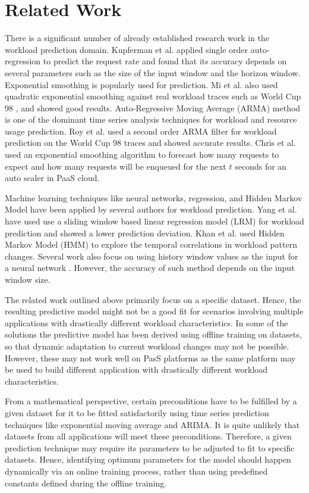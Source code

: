 \section{Related Work}

There is a significant number of already established research work in the workload prediction domain. Kupferman et al. \cite{Kupferman_2009} applied single order auto-regression to predict the request rate and found that its accuracy depends on several parameters such as the size of the input window and the horizon window. Exponential smoothing is popularly used for prediction. Mi et al. \cite{Mi_2010} also used quadratic exponential smoothing against real workload traces such as World Cup 98 \cite{WorldCup_1998}, and showed good results. Auto-Regressive Moving Average (ARMA) method is one of the dominant time series analysis techniques for workload and resource usage prediction. Roy et al. \cite{Roy_2011} used a second order ARMA filter for workload prediction on the World Cup 98 traces and showed accurate results. Chris et al. used an exponential smoothing algorithm to forecast how many requests to expect and how many requests will be enqueued for the next $t$ seconds \cite{Bunch_2012} for an auto scaler in PaaS cloud.

Machine learning techniques like neural networks, regression, and Hidden Markov Model have been applied by several authors for workload prediction. Yang et al. \cite{Yang_2013} have used use a sliding window based linear regression model (LRM) for workload prediction and showed a lower prediction deviation. Khan et al. \cite{Khan_2012} used Hidden Markov Model (HMM) to explore the temporal correlations in workload pattern changes. Several work also focus on using history window values as the input for a neural network \cite{Islam_2012}. However, the accuracy of such method depends on the input window size.

The related work outlined above primarily focus on a specific dataset. Hence, the resulting predictive model might not be a good fit for scenarios involving multiple applications with drastically different workload characteristics. In some of the solutions the predictive model has been derived using offline training on datasets, so that dynamic adaptation to current workload changes may not be possible. However, these may not work well on PasS platforms as the same platform may be used to build different application with drastically different workload characteristics.

From a mathematical perspective, certain preconditions have to be fulfilled by a given dataset for it to be fitted satisfactorily using time series prediction techniques like exponential moving average and ARIMA. It is quite unlikely that datasets from all applications will meet these preconditions. Therefore, a given prediction technique may require its parameters to be adjusted to fit to specific datasets. Hence, identifying optimum parameters for the model should happen dynamically via an online training process, rather than using predefined constants defined during the offline training.